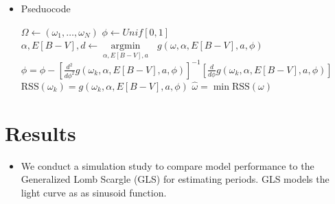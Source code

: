 \documentclass[a0,portrait]{a0poster}
\newcommand{\argmin}[1]{\underset{#1}{\operatorname{argmin}}\text{ }}
\begin{document}
\begin{multicols}{2}
\begin{itemize}
\item Pseduocode

\begin{algorithmic}[1]
  \State $\Omega \gets (\omega_1,\ldots,\omega_N)$ 
  \State $\phi \gets Unif[0,1]$ 
  \State $\alpha,E[B-V],d \gets \argmin{\alpha,E[B-V],a} g(\omega,\alpha,E[B-V],a,\phi)$  
  \State $\phi = \phi - \left[\frac{d^2}{d\phi^2}g(\omega_k,\alpha,E[B-V],a,\phi)\right]^{-1}\left[\frac{d}{d\phi}g(\omega_k,\alpha,E[B-V],a,\phi)\right] $ 
  \EndFor
  \State $\text{RSS}(\omega_k) = g(\omega_k,\alpha,E[B-V],a,\phi)$
  \EndFor
  \State $\widehat{\omega} = \min \text{RSS}(\omega)$
\end{algorithmic}







\end{itemize}


\section*{Results}

\begin{itemize}

\item We conduct a simulation study to compare model performance to the Generalized Lomb Scargle (GLS) for estimating periods. GLS models the light curve as as sinusoid function.


\end{itemize}
\end{multicols}
\end{document}
